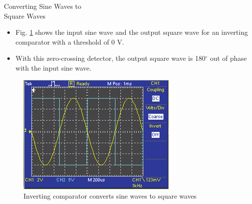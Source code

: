 \documentclass[pdflatex,compress]{beamer}
\begin{document}
\begin{frame}{Converting Sine Waves to\\Square Waves}
	\begin{multicols}{2}
		\begin{itemize}
			\item Fig. \ref{fig:img07} shows the input sine wave and the output square wave for an inverting comparator with a threshold of 0 V.
			\item With this zero-crossing detector, the output square wave is 180$^{\circ}$ out of phase with the input sine wave.
		\end{itemize}
		\columnbreak
		\begin{figure}
			\centering
			\includegraphics[width=\linewidth]{img/img07}
			\caption{Inverting comparator converts sine waves to square waves}
			\label{fig:img07}
		\end{figure}
	\end{multicols}
\end{frame}
\end{document}
